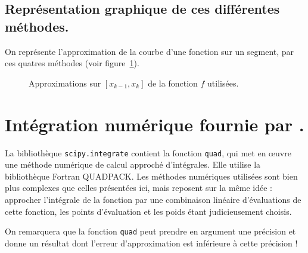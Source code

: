 
\subsection{Représentation graphique de ces différentes méthodes.}
On représente l'approximation de la courbe d'une fonction sur un segment, par ces quatres méthodes (voir figure~\ref{fig.integrales}).

\begin{figure}[!h]
  \begin{center}
    \caption{Approximations sur $[x_{k-1},x_{k}]$ de la fonction $f$ utilisées.}
    \label{fig.integrales}
  \end{center}
\end{figure}

\section{Intégration numérique fournie par \python.}

La bibliothèque \texttt{scipy.integrate} contient la fonction \texttt{quad}, qui met en \oe{}uvre une méthode numérique de calcul approché d'intégrales. 
Elle utilise la bibliothèque Fortran QUADPACK. 
Les méthodes numériques utilisées sont bien plus complexes que celles présentées ici, mais reposent sur la même idée : approcher l'intégrale de la fonction par une combinaison linéaire d'évaluations de cette fonction, les points d'évaluation et les poids étant judicieusement choisis. 

On remarquera que la fonction \texttt{quad} peut prendre en argument une précision et donne un résultat dont l'erreur d'approximation est inférieure à cette précision ! 


